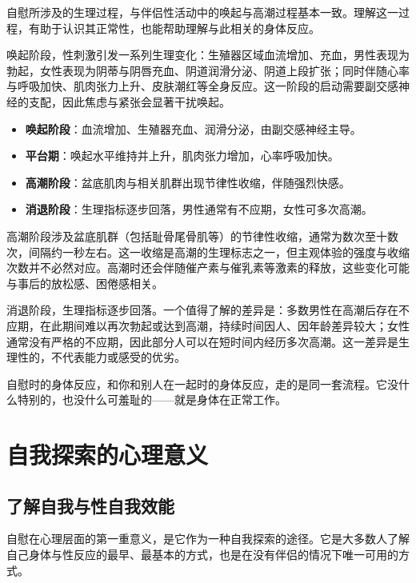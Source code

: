 \documentclass[12pt,UTF8]{ctexbook}
\begin{document}
自慰所涉及的生理过程，与伴侣性活动中的唤起与高潮过程基本一致。理解这一过程，有助于认识其正常性，也能帮助理解与此相关的身体反应。

唤起阶段，性刺激引发一系列生理变化：生殖器区域血流增加、充血，男性表现为勃起，女性表现为阴蒂与阴唇充血、阴道润滑分泌、阴道上段扩张；同时伴随心率与呼吸加快、肌肉张力上升、皮肤潮红等全身反应。这一阶段的启动需要副交感神经的支配，因此焦虑与紧张会显著干扰唤起。

\begin{itemize}
\item \textbf{唤起阶段}：血流增加、生殖器充血、润滑分泌，由副交感神经主导。
\item \textbf{平台期}：唤起水平维持并上升，肌肉张力增加，心率呼吸加快。
\item \textbf{高潮阶段}：盆底肌肉与相关肌群出现节律性收缩，伴随强烈快感。
\item \textbf{消退阶段}：生理指标逐步回落，男性通常有不应期，女性可多次高潮。
\end{itemize}

高潮阶段涉及盆底肌群（包括耻骨尾骨肌等）的节律性收缩，通常为数次至十数次，间隔约一秒左右。这一收缩是高潮的生理标志之一，但主观体验的强度与收缩次数并不必然对应。高潮时还会伴随催产素与催乳素等激素的释放，这些变化可能与事后的放松感、困倦感相关。

消退阶段，生理指标逐步回落。一个值得了解的差异是：多数男性在高潮后存在不应期，在此期间难以再次勃起或达到高潮，持续时间因人、因年龄差异较大；女性通常没有严格的不应期，因此部分人可以在短时间内经历多次高潮。这一差异是生理性的，不代表能力或感受的优劣。

\begin{tcolorbox}[colback=pink!5!white,colframe=red!50!black,title=贴心小叮咛]
自慰时的身体反应，和你和别人在一起时的身体反应，走的是同一套流程。它没什么特别的，也没什么可羞耻的——就是身体在正常工作。
\end{tcolorbox}

\section{自我探索的心理意义}

\subsection{了解自我与性自我效能}

自慰在心理层面的第一重意义，是它作为一种自我探索的途径。它是大多数人了解自己身体与性反应的最早、最基本的方式，也是在没有伴侣的情况下唯一可用的方式。
\end{document}
